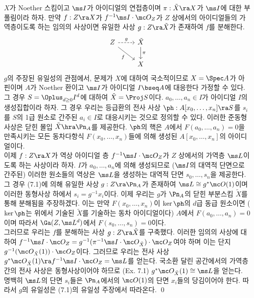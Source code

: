 	
	\begin{proposition}
	$X$가 Noether 스킴이고 $\ms I$가 아이디얼의 연접층이며 $\pi:\tilde X\ra X$가 $\ms I$에 대한 부풀림이라 하자.
	만약 $f:Z\ra X$가 $f^{-1}\ms I\cdot\mc O_Z$가 $Z$ 상에서의 아이디얼들의 가역층이도록 하는 임의의 사상이면
	유일한 사상 $g:Z\ra\tilde X$가 존재하여 $f$를 분해한다.
	$$\begin{tikzcd}Z\arrow[dashed,"g",r]\arrow[dr,swap,"f"]&\tilde X\arrow[d,"\pi"]\\&X\end{tikzcd}$$
	\pf $g$의 주장된 유일성의 관점에서, 문제가 $X$에 대하여 국소적이므로 $X=\Spec A$가 아핀이며 $A$가 Noether 환이고
	$\ms I$가 아이디얼 $I\bseq A$에 대응한다 가정할 수 있다.
	그 경우 $S=\Oplus_{d\ge 0}I^d$에 대하여 $\tilde X=\Proj S$이다. $a_0,\ldots,a_n\in I$가 아이디얼 $I$의 생성집합이라 하자.
	그 경우 우리는 등급환의 전사 사상 $\ph:A[x_0,\ldots,x_n]\ra S$를
	$s_i$를 $S$의 1급 원소로 간주된 $a_i\in I$로 대응시키는 것으로 정의할 수 있다.
	이러한 준동형사상은 닫힌 몰입 $\tilde X\hra\Pn_A$를 제공한다.
	$\ph$의 핵은 $A$에서 $F(a_0,\ldots,a_n)=0$을 만족시키는 모든 동차다항식 $F(x_0,\ldots,x_n)$들에 의해 생성된
	$A[x_0,\ldots,x_n]$의 아이디얼이다.\\
	이제 $f:Z\ra X$가 역상 아이디얼 층 $f^{-1}\ms I\cdot\mc O_Z$가 $Z$ 상에서의 가역층 $\ms L$이도록 하는 사상이라 하자.
	$I$가 $a_0,\ldots,a_n$에 의해 생성되므로 ($\ms I$의 대역적 단면으로 간주된) 이러한 원소들의 역상은
	$\ms L$을 생성하는 대역적 단면 $s_0,\ldots,s_n$을 제공한다.
	그 경우 (7.1)에 의해 유일한 사상 $g:Z\ra\Pn_A$가 존재하여
	$\ms L\cong g^*\mc O(1)$이며 이러한 동형사상 하에서 $s_i=g^{-1}x_i$이다.
	이제 우리는 $g$가 $\Pn_A$의 닫힌 부분스킴 $\tilde X$를 통해 분해됨을 주장하겠다.
	이는 만약 $F(x_0,\ldots,x_n)$이 $\ker\ph$의 $d$급 동급 원소이면
	($\ker\ph$는 위에서 기술된 $\tilde X$를 기술하는 동차 아이디얼이다)
	$A$에서 $F(a_0,\ldots,a_n)=0$이며 따라서 $\Ga(Z,\ms L^d)$에서 $F(s_0,\ldots,s_n)=0$이다.\\
	그러므로 우리는 $f$를 분해하는 사상 $g:Z\ra\tilde X$를 구축했다.
	이러한 임의의 사상에 대하여 $f^{-1}\ms I\cdot\mc O_Z=g^{-1}(\pi^{-1}\ms I\cdot\mc O_{\tilde X})\cdot\mc O_Z$여야 하며
	이는 단지 $g^{-1}(\mc O_{\tilde X}(1))\cdot\mc O_Z$이다.
	그러므로 우리는 전사 사상 $g^*\mc O_{\tilde X}(1)\ra f^{-1}\ms I\cdot\mc O_Z=\ms L$를 얻는다.
	국소환 달린 공간에서의 가역층 간의 전사 사상은 동형사상이어야 하므로 (Ex. 7.1) $g^*\mc O_{\tilde X}(1)\cong\ms L$을 얻는다.
	명백히 $\ms L$의 단면 $s_i$들은 $\Pn_A$에서의 $\mc O(1)$의 단면 $x_i$들의 당김이어야 한다.
	따라서 $g$의 유일성은 (7.1)의 유일성 주장에서 따라온다.
	\qed
	\end{proposition}
	
